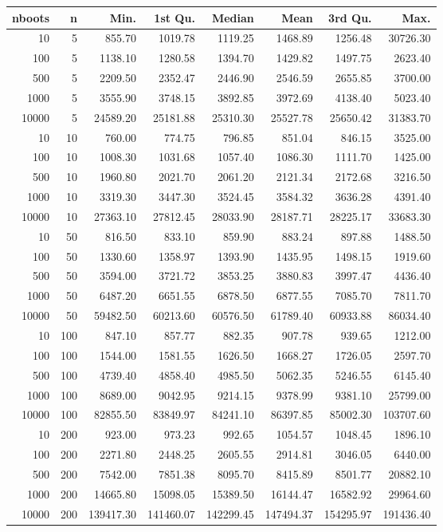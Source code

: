 \begin{table}[ht]
\centering
\begin{tabular}{rrrrrrrr}
  \hline
nboots & n & Min. & 1st Qu. & Median & Mean & 3rd Qu. & Max. \\ 
  \hline
10 & 5 & 855.70 & 1019.78 & 1119.25 & 1468.89 & 1256.48 & 30726.30 \\ 
  100 & 5 & 1138.10 & 1280.58 & 1394.70 & 1429.82 & 1497.75 & 2623.40 \\ 
  500 & 5 & 2209.50 & 2352.47 & 2446.90 & 2546.59 & 2655.85 & 3700.00 \\ 
  1000 & 5 & 3555.90 & 3748.15 & 3892.85 & 3972.69 & 4138.40 & 5023.40 \\ 
  10000 & 5 & 24589.20 & 25181.88 & 25310.30 & 25527.78 & 25650.42 & 31383.70 \\ 
  10 & 10 & 760.00 & 774.75 & 796.85 & 851.04 & 846.15 & 3525.00 \\ 
  100 & 10 & 1008.30 & 1031.68 & 1057.40 & 1086.30 & 1111.70 & 1425.00 \\ 
  500 & 10 & 1960.80 & 2021.70 & 2061.20 & 2121.34 & 2172.68 & 3216.50 \\ 
  1000 & 10 & 3319.30 & 3447.30 & 3524.45 & 3584.32 & 3636.28 & 4391.40 \\ 
  10000 & 10 & 27363.10 & 27812.45 & 28033.90 & 28187.71 & 28225.17 & 33683.30 \\ 
  10 & 50 & 816.50 & 833.10 & 859.90 & 883.24 & 897.88 & 1488.50 \\ 
  100 & 50 & 1330.60 & 1358.97 & 1393.90 & 1435.95 & 1498.15 & 1919.60 \\ 
  500 & 50 & 3594.00 & 3721.72 & 3853.25 & 3880.83 & 3997.47 & 4436.40 \\ 
  1000 & 50 & 6487.20 & 6651.55 & 6878.50 & 6877.55 & 7085.70 & 7811.70 \\ 
  10000 & 50 & 59482.50 & 60213.60 & 60576.50 & 61789.40 & 60933.88 & 86034.40 \\ 
  10 & 100 & 847.10 & 857.77 & 882.35 & 907.78 & 939.65 & 1212.00 \\ 
  100 & 100 & 1544.00 & 1581.55 & 1626.50 & 1668.27 & 1726.05 & 2597.70 \\ 
  500 & 100 & 4739.40 & 4858.40 & 4985.50 & 5062.35 & 5246.55 & 6145.40 \\ 
  1000 & 100 & 8689.00 & 9042.95 & 9214.15 & 9378.99 & 9381.10 & 25799.00 \\ 
  10000 & 100 & 82855.50 & 83849.97 & 84241.10 & 86397.85 & 85002.30 & 103707.60 \\ 
  10 & 200 & 923.00 & 973.23 & 992.65 & 1054.57 & 1048.45 & 1896.10 \\ 
  100 & 200 & 2271.80 & 2448.25 & 2605.55 & 2914.81 & 3046.05 & 6440.00 \\ 
  500 & 200 & 7542.00 & 7851.38 & 8095.70 & 8415.89 & 8501.77 & 20882.10 \\ 
  1000 & 200 & 14665.80 & 15098.05 & 15389.50 & 16144.47 & 16582.92 & 29964.60 \\ 
  10000 & 200 & 139417.30 & 141460.07 & 142299.45 & 147494.37 & 154295.97 & 191436.40 \\ 
   \hline
\end{tabular}
\end{table}
